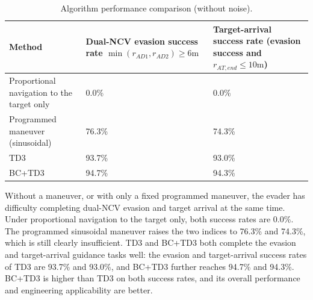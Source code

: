 \begin{table}[H]
\centering
\caption{Algorithm performance comparison (without noise).}
\label{tab:perf-nonoise}
\small
\begin{tabularx}{\linewidth}{lXX}
\toprule
Method & Dual-NCV evasion success rate $\min ({r_{AD1}},{r_{AD2}}) \geqslant 6{\text{m}}$ & Target-arrival success rate (evasion success and ${r_{AT,end}} \leqslant 10{\text{m}}$) \\
\midrule
Proportional navigation to the target only & 0.0\% & 0.0\% \\
Programmed maneuver (sinusoidal) & 76.3\% & 74.3\% \\
TD3 & 93.7\% & 93.0\% \\
BC+TD3 & 94.7\% & 94.3\% \\
\bottomrule
\end{tabularx}
\end{table}
Without a maneuver, or with only a fixed programmed maneuver, the evader has difficulty completing dual-NCV evasion and target arrival at the same time. Under proportional navigation to the target only, both success rates are 0.0\%. The programmed sinusoidal maneuver raises the two indices to 76.3\% and 74.3\%, which is still clearly insufficient. TD3 and BC+TD3 both complete the evasion and target-arrival guidance tasks well: the evasion and target-arrival success rates of TD3 are 93.7\% and 93.0\%, and BC+TD3 further reaches 94.7\% and 94.3\%. BC+TD3 is higher than TD3 on both success rates, and its overall performance and engineering applicability are better.

